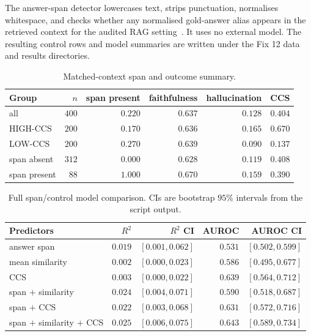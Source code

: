 The answer-span detector lowercases text, strips punctuation,
normalises whitespace, and checks whether any normalised gold-answer
alias appears in the retrieved context for the audited RAG
setting~\citep{lewis2020rag}. It uses no external model. The resulting
control rows and model summaries are written under the Fix 12 data and
results directories.

\begin{table}[!htb]
\centering
\caption{Matched-context span and outcome summary.}
\footnotesize
\begin{tabular}{lrrrrr}
\toprule
Group & $n$ & span present & faithfulness & hallucination & CCS \\
\midrule
all          & $400$ & $0.220$ & $0.637$ & $0.128$ & $0.404$ \\
HIGH-CCS     & $200$ & $0.170$ & $0.636$ & $0.165$ & $0.670$ \\
LOW-CCS      & $200$ & $0.270$ & $0.639$ & $0.090$ & $0.137$ \\
span absent  & $312$ & $0.000$ & $0.628$ & $0.119$ & $0.408$ \\
span present & $\phantom{1}88$ & $1.000$ & $0.670$ & $0.159$ & $0.390$ \\
\bottomrule
\end{tabular}
\end{table}

\begin{table}[!htb]
\centering
\caption{Full span/control model comparison. CIs are bootstrap $95\%$
intervals from the script output.}
\footnotesize
\begin{tabular}{lrrrr}
\toprule
Predictors & $R^2$ & $R^2$ CI & AUROC & AUROC CI \\
\midrule
answer span                   & $0.019$ & $[0.001, 0.062]$ & $0.531$ & $[0.502, 0.599]$ \\
mean similarity               & $0.002$ & $[0.000, 0.023]$ & $0.586$ & $[0.495, 0.677]$ \\
CCS                           & $0.003$ & $[0.000, 0.022]$ & $0.639$ & $[0.564, 0.712]$ \\
span $+$ similarity           & $0.024$ & $[0.004, 0.071]$ & $0.590$ & $[0.518, 0.687]$ \\
span $+$ CCS                  & $0.022$ & $[0.003, 0.068]$ & $0.631$ & $[0.572, 0.716]$ \\
span $+$ similarity $+$ CCS   & $0.025$ & $[0.006, 0.075]$ & $0.643$ & $[0.589, 0.734]$ \\
\bottomrule
\end{tabular}
\end{table}

